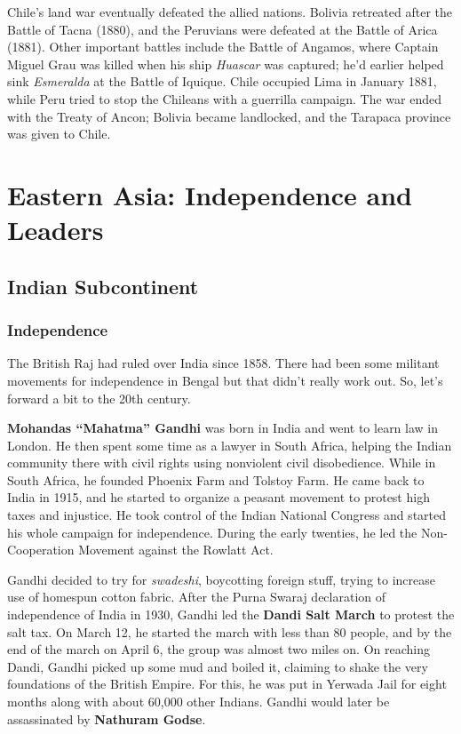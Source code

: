 Chile's land war eventually defeated the allied nations.
Bolivia retreated after the Battle of Tacna (1880),
and the Peruvians were defeated at the Battle of Arica (1881).
Other important battles include the Battle of Angamos,
where Captain Miguel Grau was killed when his ship \textit{Huascar} was captured;
he'd earlier helped sink \textit{Esmeralda} at the Battle of Iquique.
Chile occupied Lima in January 1881, while Peru tried to stop the Chileans with a guerrilla campaign.
The war ended with the Treaty of Ancon;
Bolivia became landlocked, and the Tarapaca province was given to Chile.

\section{Eastern Asia: Independence and Leaders}

\subsection*{Indian Subcontinent}

\subsubsection*{Independence}

The British Raj had ruled over India since 1858.
There had been some militant movements for independence in Bengal but that didn't really work out.
So, let's forward a bit to the 20th century.

\textbf{Mohandas ``Mahatma'' Gandhi} was born in India and went to learn law in London.
He then spent some time as a lawyer in South Africa,
helping the Indian community there with civil rights using nonviolent civil disobedience.
While in South Africa, he founded Phoenix Farm and Tolstoy Farm.
He came back to India in 1915, and he started to organize a peasant movement to protest high taxes and injustice.
He took control of the Indian National Congress and started his whole campaign for independence.
During the early twenties, he led the Non-Cooperation Movement against the Rowlatt Act.

Gandhi decided to try for \textit{swadeshi}, boycotting foreign stuff,
trying to increase use of homespun cotton fabric.
After the Purna Swaraj declaration of independence of India in 1930,
Gandhi led the \textbf{Dandi Salt March} to protest the salt tax.
On March 12, he started the march with less than 80 people,
and by the end of the march on April 6, the group was almost two miles on.
On reaching Dandi, Gandhi picked up some mud and boiled it,
claiming to shake the very foundations of the British Empire.
For this, he was put in Yerwada Jail for eight months along with about 60,000 other Indians.
Gandhi would later be assassinated by \textbf{Nathuram Godse}.

